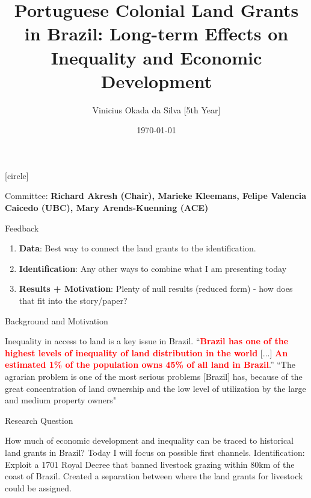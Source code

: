 \documentclass[aspectratio=1610]{beamer}
\title{Portuguese Colonial Land Grants in Brazil: Long-term Effects on Inequality and Economic Development}
\author{Vinicius Okada da Silva [5th Year]}
\date{\today}
\begin{document}
[circle]

\begin{frame}
	\titlepage
    \begin{center}
        Committee: \textbf{Richard Akresh (Chair), Marieke Kleemans, Felipe Valencia Caicedo (UBC), Mary Arends-Kuenning (ACE)}
    \end{center}
\end{frame}

\begin{frame}{Feedback}
    \begin{enumerate}
        \item \textbf{Data}: Best way to connect the land grants to the identification.
        \vspace{2mm}
        \item \textbf{Identification}: Any other ways to combine what I am presenting today 
        \vspace{2mm}
        \item \textbf{Results + Motivation}: Plenty of null results (reduced form) - how does that fit into the story/paper?
    \end{enumerate}
\end{frame}

\begin{frame}{Background and Motivation}
    \begin{outline}
        \1 Inequality in access to land is a key issue in Brazil.
            \vspace{2mm}
            \2 ``\textcolor{red}{\textbf{Brazil has one of the highest levels of inequality of land distribution in the world}} [...] \textcolor{red}{\textbf{An estimated 1\% of the population owns 45\% of all land in Brazil}}.'' \parencite{Usaid2016-xs}
        \vspace{2mm}
        \pause 
        \1 ``The agrarian problem is one of the most serious problems [Brazil] has, because of the great concentration of land ownership and the low level of utilization by the large and medium property owners" \parencite[p.~1]{De_Oliveira_Andrade1980-xz}
    \end{outline}
\end{frame}

\begin{frame}{Research Question}
    \begin{outline}
        \1 How much of economic development and inequality can be traced to historical land grants in Brazil?
        \vspace{2mm}
            \2 Today I will focus on possible first channels.
        \vspace{2mm}
        \pause 
        \1 Identification:
        \vspace{2mm}
            \2 Exploit a 1701 Royal Decree that banned livestock grazing within 80km of the coast of Brazil.
        \vspace{2mm}
            \2 Created a separation between where the land grants for livestock could be assigned.
    \end{outline}
\end{frame}
\end{document}
